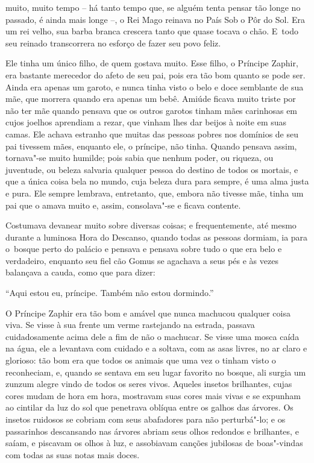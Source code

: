  

 muito, muito tempo -- há tanto tempo que, se alguém tenta pensar tão
longe no passado, é ainda mais longe \mbox{--,} o Rei Mago reinava no País Sob
o Pôr do Sol. Era um rei velho, sua barba branca crescera tanto que
quase tocava o chão. E~todo seu reinado transcorrera no esforço de fazer
seu povo feliz.

Ele tinha um único filho, de quem gostava muito. Esse filho, o Príncipe
Zaphir, era bastante merecedor do afeto de seu pai, pois era tão bom
quanto se pode ser. Ainda era apenas um garoto, e nunca tinha visto
o belo e doce semblante de sua mãe, que morrera quando era apenas um
bebê. Amiúde ficava muito triste por não ter mãe quando pensava que os
outros garotos tinham mães carinhosas em cujos joelhos aprendiam a
rezar, que vinham lhes dar beijos à noite em suas camas. Ele achava
estranho que muitas das pessoas pobres nos domínios de seu pai tivessem
mães, enquanto ele, o príncipe, não tinha. Quando pensava assim,
tornava"-se muito humilde; pois sabia que nenhum poder, ou riqueza, ou
juventude, ou beleza salvaria qualquer pessoa do destino de todos os
mortais, e que a única coisa bela no mundo, cuja beleza dura para
sempre, é uma alma justa e pura. Ele sempre lembrava, entretanto, que,
embora não tivesse mãe, tinha um pai que o amava muito e, assim,
consolava"-se e ficava contente.



Costumava devanear muito sobre diversas coisas; e frequentemente,
até mesmo durante a luminosa Hora do Descanso, quando todas as pessoas
dormiam, ia para o~bosque perto do palácio e pensava e pensava sobre
tudo o que era belo e verdadeiro, enquanto seu fiel cão Gomus se
agachava a seus pés e às vezes balançava a cauda, como que para dizer:

``Aqui estou eu, príncipe. Também não estou dormindo.''

O Príncipe Zaphir era tão bom e amável que nunca machucou qualquer coisa
viva. Se visse à sua frente um verme rastejando na estrada, passava
cuidadosamente acima dele a fim de não o machucar. Se visse uma mosca
caída na água, ele a levantava com cuidado e a soltava, com as asas
livres, no ar claro e glorioso: tão bom era que todos os animais que
uma vez o tinham visto o reconheciam, e, quando se sentava em seu lugar
favorito no bosque, ali surgia um zunzum alegre vindo de todos os
seres vivos. Aqueles insetos brilhantes, cujas cores mudam de hora em
hora, mostravam suas cores mais vivas e se expunham ao cintilar da luz
do sol que penetrava oblíqua entre os galhos das árvores. Os insetos
ruidosos se cobriam com seus abafadores para não perturbá"-lo; e os
passarinhos descansando nas árvores abriam seus olhos redondos e
brilhantes, e saíam, e piscavam os olhos à luz, e assobiavam canções
jubilosas de boas"-vindas com todas as suas notas mais doces.

